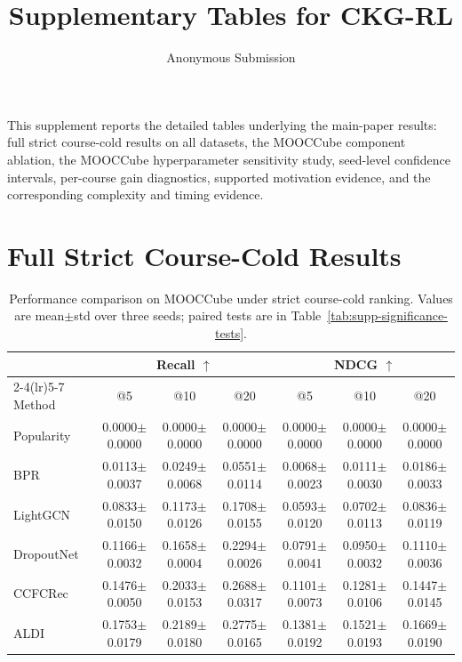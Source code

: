 \documentclass[letterpaper]{article}
\title{Supplementary Tables for CKG-RL}
\author{Anonymous Submission}
\newcommand{\sd}[1]{{\footnotesize$\pm$#1}}
\newcommand{\tablecaptiongap}{\vspace{0.35em}}
\begin{document}
\maketitle

This supplement reports the detailed tables underlying the main-paper results:
full strict course-cold results on all datasets, the MOOCCube component ablation,
the MOOCCube hyperparameter sensitivity study, seed-level confidence intervals,
per-course gain diagnostics, supported motivation evidence, and the corresponding
complexity and timing evidence.

\section{Full Strict Course-Cold Results}

\begin{table}[t]
\centering
\caption{Performance comparison on MOOCCube under strict course-cold ranking. Values are mean\(\pm\)std over three seeds; paired tests are in Table~\ref{tab:supp-significance-tests}.}
\label{tab:supp-mooccube-cold}
\tablecaptiongap
\small
\begin{tabular*}{\textwidth}{@{\extracolsep{\fill}}lcccccc}
\toprule
& \multicolumn{3}{c}{Recall \(\uparrow\)} & \multicolumn{3}{c}{NDCG \(\uparrow\)} \\
\cmidrule(lr){2-4}\cmidrule(lr){5-7}
Method & \multicolumn{1}{c}{@5} & \multicolumn{1}{c}{@10} & \multicolumn{1}{c}{@20} & \multicolumn{1}{c}{@5} & \multicolumn{1}{c}{@10} & \multicolumn{1}{c}{@20} \\
\midrule
Popularity & 0.0000\sd{0.0000} & 0.0000\sd{0.0000} & 0.0000\sd{0.0000} & 0.0000\sd{0.0000} & 0.0000\sd{0.0000} & 0.0000\sd{0.0000} \\
BPR & 0.0113\sd{0.0037} & 0.0249\sd{0.0068} & 0.0551\sd{0.0114} & 0.0068\sd{0.0023} & 0.0111\sd{0.0030} & 0.0186\sd{0.0033} \\
LightGCN & 0.0833\sd{0.0150} & 0.1173\sd{0.0126} & 0.1708\sd{0.0155} & 0.0593\sd{0.0120} & 0.0702\sd{0.0113} & 0.0836\sd{0.0119} \\
DropoutNet & 0.1166\sd{0.0032} & 0.1658\sd{0.0004} & 0.2294\sd{0.0026} & 0.0791\sd{0.0041} & 0.0950\sd{0.0032} & 0.1110\sd{0.0036} \\
CCFCRec & 0.1476\sd{0.0050} & 0.2033\sd{0.0153} & 0.2688\sd{0.0317} & 0.1101\sd{0.0073} & 0.1281\sd{0.0106} & 0.1447\sd{0.0145} \\
ALDI & 0.1753\sd{0.0179} & 0.2189\sd{0.0180} & 0.2775\sd{0.0165} & 0.1381\sd{0.0192} & 0.1521\sd{0.0193} & 0.1669\sd{0.0190} \\

\end{tabular*}
\end{table}
\end{document}
